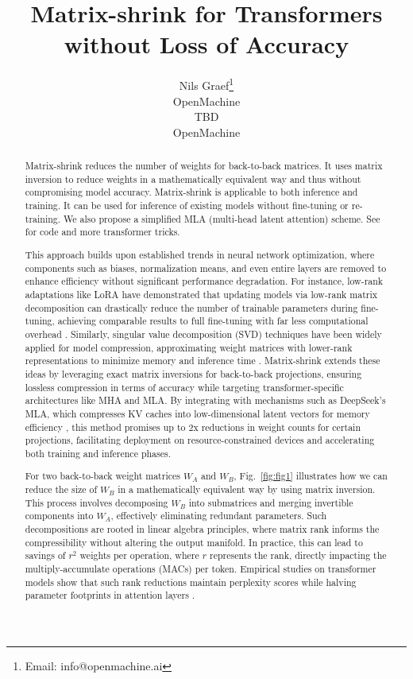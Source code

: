 \documentclass{article}
\title{Matrix-shrink for Transformers without Loss of Accuracy}
\author{
  Nils Graef\thanks{Email: info@openmachine.ai} \\
  OpenMachine \\
  \And
  TBD \\
  OpenMachine
}
\begin{document}
\maketitle

\begin{abstract}
Matrix-shrink reduces the number of weights for back-to-back matrices. It uses matrix inversion to reduce weights in a mathematically equivalent way and thus without compromising model accuracy. Matrix-shrink is applicable to both inference and training. It can be used for inference of existing models without fine-tuning or re-training. We also propose a simplified MLA (multi-head latent attention) scheme. See \cite{openmachine2024} for code and more transformer tricks.

This approach builds upon established trends in neural network optimization, where components such as biases, normalization means, and even entire layers are removed to enhance efficiency without significant performance degradation. For instance, low-rank adaptations like LoRA have demonstrated that updating models via low-rank matrix decomposition can drastically reduce the number of trainable parameters during fine-tuning, achieving comparable results to full fine-tuning with far less computational overhead \cite{medium2025lora}. Similarly, singular value decomposition (SVD) techniques have been widely applied for model compression, approximating weight matrices with lower-rank representations to minimize memory and inference time \cite{lesswrong2022svd}. Matrix-shrink extends these ideas by leveraging exact matrix inversions for back-to-back projections, ensuring lossless compression in terms of accuracy while targeting transformer-specific architectures like MHA and MLA. By integrating with mechanisms such as DeepSeek's MLA, which compresses KV caches into low-dimensional latent vectors for memory efficiency \cite{deepseek2024}, this method promises up to 2x reductions in weight counts for certain projections, facilitating deployment on resource-constrained devices and accelerating both training and inference phases.

For two back-to-back weight matrices $W_A$ and $W_B$, Fig.~\ref{fig:fig1} illustrates how we can reduce the size of $W_B$ in a mathematically equivalent way by using matrix inversion. This process involves decomposing $W_B$ into submatrices and merging invertible components into $W_A$, effectively eliminating redundant parameters. Such decompositions are rooted in linear algebra principles, where matrix rank informs the compressibility without altering the output manifold. In practice, this can lead to savings of $r^{2}$ weights per operation, where $r$ represents the rank, directly impacting the multiply-accumulate operations (MACs) per token. Empirical studies on transformer models show that such rank reductions maintain perplexity scores while halving parameter footprints in attention layers \cite{arxiv2024feature}.
\end{abstract}
\end{document}
